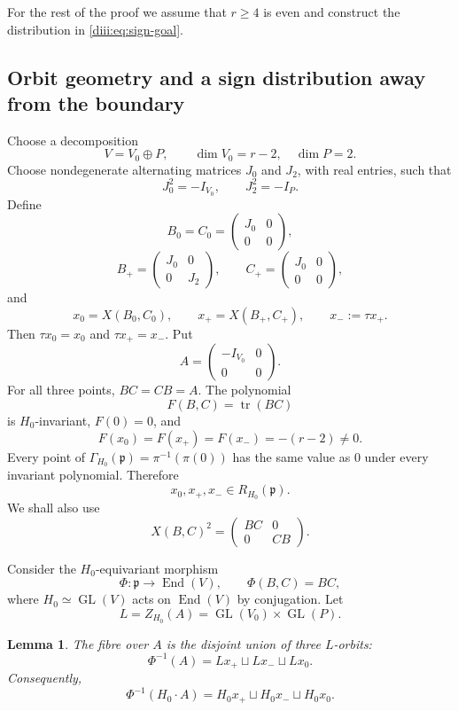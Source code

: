\documentclass[10pt,a4paper]{amsart}
\numberwithin{equation}{section}
\newtheorem{lemma}[theorem]{Lemma}
\newcommand{\GL}{\operatorname{GL}}
\newcommand{\End}{\operatorname{End}}
\newcommand{\tr}{\operatorname{tr}}
\newcommand{\fp}{\mathfrak p}
\begin{document}
For the rest of the proof we assume that $r\ge4$ is even and construct the distribution in \eqref{diii:eq:sign-goal}.

\subsection{Orbit geometry and a sign distribution away from the boundary}

Choose a decomposition
\[
  V=V_0\oplus P,
  \qquad \dim V_0=r-2,\quad \dim P=2.
\]
Choose nondegenerate alternating matrices $J_0$ and $J_2$, with real entries, such that
\[
  J_0^2=-I_{V_0},\qquad J_2^2=-I_P.
\]
Define
\[
 B_0=C_0=\begin{pmatrix}J_0&0\\0&0\end{pmatrix},
\]
\[
 B_+=\begin{pmatrix}J_0&0\\0&J_2\end{pmatrix},
 \qquad
 C_+=\begin{pmatrix}J_0&0\\0&0\end{pmatrix},
\]
and
\[
  x_0=X(B_0,C_0),\qquad
  x_+=X(B_+,C_+),\qquad
  x_-:=\tau x_+.
\]
Then $\tau x_0=x_0$ and $\tau x_+=x_-$.  Put
\[
  A=\begin{pmatrix}-I_{V_0}&0\\0&0\end{pmatrix}.
\]
For all three points, $BC=CB=A$.  The polynomial
\[
  F(B,C)=\tr(BC)
\]
is $H_0$-invariant, $F(0)=0$, and
\[
  F(x_0)=F(x_+)=F(x_-)=-(r-2)\ne0.
\]
Every point of $\Gamma_{H_0}(\fp)=\pi^{-1}(\pi(0))$ has the same value as $0$ under every invariant polynomial.  Therefore
\begin{equation}\label{diii:eq:pointsR}
  x_0,x_+,x_-\in R_{H_0}(\fp).
\end{equation}
We shall also use
\begin{equation}\label{diii:eq:square}
  X(B,C)^2=\begin{pmatrix}BC&0\\0&CB\end{pmatrix}.
\end{equation}

Consider the $H_0$-equivariant morphism
\[
  \Phi:\fp\to\End(V),\qquad \Phi(B,C)=BC,
\]
where $H_0\simeq\GL(V)$ acts on $\End(V)$ by conjugation.  Let
\[
  L=Z_{H_0}(A)=\GL(V_0)\times\GL(P).
\]

\begin{lemma}\label{diii:lem:fiber}
The fibre over $A$ is the disjoint union of three $L$-orbits:
\[
  \Phi^{-1}(A)=Lx_+\sqcup Lx_-\sqcup Lx_0.
\]
Consequently,
\begin{equation}\label{diii:eq:preimage-conjclass}
  \Phi^{-1}(H_0\cdot A)
  =H_0x_+\sqcup H_0x_-\sqcup H_0x_0.
\end{equation}
\end{lemma}
\end{document}
